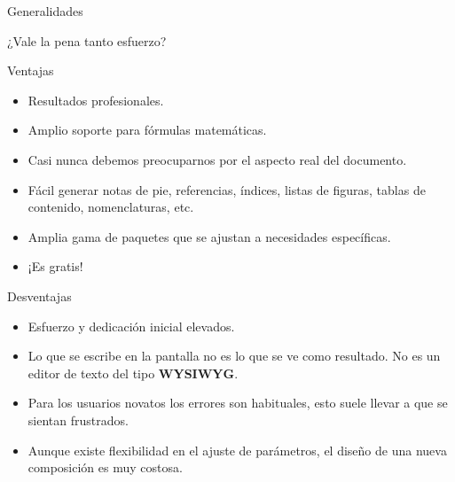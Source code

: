 \documentclass[10pt]{beamer}
\begin{document}
\begin{frame}{Generalidades}

\begin{block}{¿Vale la pena tanto esfuerzo?}
	\begin{multicols}{2}
	
	\begin{footnotesize}
	\begin{block}{Ventajas}
		\begin{itemize}
			\item Resultados profesionales.
			\item Amplio soporte para fórmulas matemáticas.
			\item Casi nunca debemos preocuparnos por el aspecto real del documento.
			\item Fácil generar notas de pie, referencias, índices, listas de figuras, tablas de contenido, nomenclaturas, etc.
			\item Amplia gama de paquetes que se ajustan a necesidades específicas.
			\item ¡Es gratis!
		\end{itemize}
	\end{block}			
	\end{footnotesize}

	\newpage	
	
	\begin{footnotesize}
	\begin{block}{Desventajas}
		\begin{itemize}
		\item Esfuerzo y dedicación inicial elevados.
		\item Lo que se escribe en la pantalla no es lo que se ve como resultado. No es un editor de texto del tipo \textbf{WYSIWYG}.
		\item Para los usuarios novatos los errores son habituales, esto suele llevar a que se sientan frustrados.
		\item Aunque existe flexibilidad en el ajuste de parámetros, el diseño de una nueva composición es muy costosa.
		\end{itemize}
		\end{block}
	\end{footnotesize}
	\end{multicols}
\end{block}

\end{frame}
\end{document}
